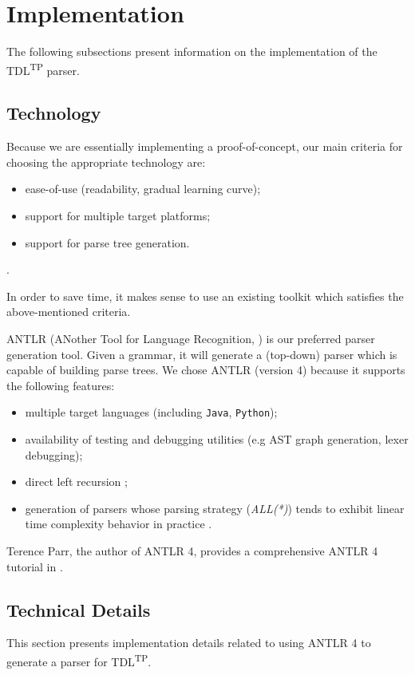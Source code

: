 \documentclass[12pt,oneside,a4paper,notitlepage]{report}
\begin{document}
	\section*{Implementation}
	\par The following subsections present information on the implementation of the TDL\textsuperscript{TP} parser.

	\subsection*{Technology}
	\par Because we are essentially implementing a proof-of-concept, our main criteria for choosing the appropriate technology are:
	\begin{itemize}
		\item ease-of-use (readability, gradual learning curve);
		\item support for multiple target platforms;
		\item support for parse tree generation.
	\end{itemize}.

	\par In order to save time, it makes sense to use an existing toolkit which satisfies the above-mentioned criteria.

	\bigskip

	\par ANTLR (ANother Tool for Language Recognition, \cite{antlrsite}) is our preferred parser generation tool. Given a grammar, it will generate a (top-down) parser which is capable of building parse trees. We chose ANTLR (version 4) because it supports the following features:
	\begin{itemize}
		\item multiple target languages (including \texttt{Java}, \texttt{Python});
		\item availability of testing and debugging utilities (e.g AST graph generation, lexer debugging);
		\item direct left recursion \cite{antlrrecursion};
		\item generation of parsers whose parsing strategy (\textit{ALL(*)}) tends to exhibit linear time complexity behavior in practice \cite{antlrcomplex}.
	\end{itemize}

	Terence Parr, the author of ANTLR 4, provides a comprehensive ANTLR 4 tutorial in \cite{antlrtutorial}.

	\subsection*{Technical Details}
	\par This section presents implementation details related to using ANTLR 4 to generate a parser for TDL\textsuperscript{TP}.
\end{document}
